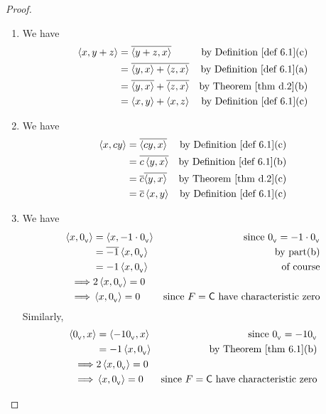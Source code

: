 \begin{proof} \ 

\begin{enumerate}
\item We have
\begin{align*}
    \LG x, y + z \RG & = \conjugatet{\LG y + z, x \RG} & \text{by \DEF{6.1}(c)} \\
        & = \conjugatet{\LG y, x \RG + \LG z, x \RG} & \text{by \DEF{6.1}(a)} \\
        & = \conjugatet{\LG y, x \RG} + \conjugatet{\LG z, x \RG} & \text{by \THM{d.2}(b)} \\
        & = \LG x, y \RG + \LG x, z \RG & \text{by \DEF{6.1}(c)}
\end{align*}

\item We have
\begin{align*}
    \LG x, cy \RG & = \conjugatet{\LG cy, x \RG} & \text{by \DEF{6.1}(c)} \\
        & = \conjugatet{c \LG y, x \RG} & \text{by \DEF{6.1}(b)} \\
        & = \conjugatet{c} \conjugatet{\LG y, x \RG} & \text{by \THM{d.2}(c)} \\
        & = \conjugatet{c} \LG x, y \RG & \text{by \DEF{6.1}(c)}
\end{align*}

\item We have
\begin{align*}
    \left< x, 0_{_{\textsf{V}}} \right> & = \left< x, -1 \cdot 0_{_{\textsf{V}}} \right> & \text{since \(0_{_{\textsf{V}}}= -1 \cdot 0_{_{\textsf{V}}}\)} \\
        & = \overline{-1} \left< x, 0_{_{\textsf{V}}} \right> & \text{by part(b)} \\
        & = -1 \left< x, 0_{_{\textsf{V}}} \right> & \text{of course} \\
    \implies & 2 \left< x, 0_{_{\textsf{V}}} \right> = 0 \\
    \implies & \left< x, 0_{_{\textsf{V}}} \right> = 0 & \text{since \(F = \textsf{C}\) have characteristic zero}
\end{align*}
Similarly,
\begin{align*}
    \LG \OV, x \RG & = \LG -1 \OV, x \RG & \text{since \(\OV = -1\OV\)} \\
        & = -1 \LG x, \OV \RG & \text{by \THM{6.1}(b)} \\
    \implies & 2 \LG x, \OV \RG = 0 \\
    \implies & \LG x, \OV \RG = 0 & \text{since \(F = \SET{C}\) have characteristic zero}
\end{align*}


\end{enumerate}
\end{proof}
